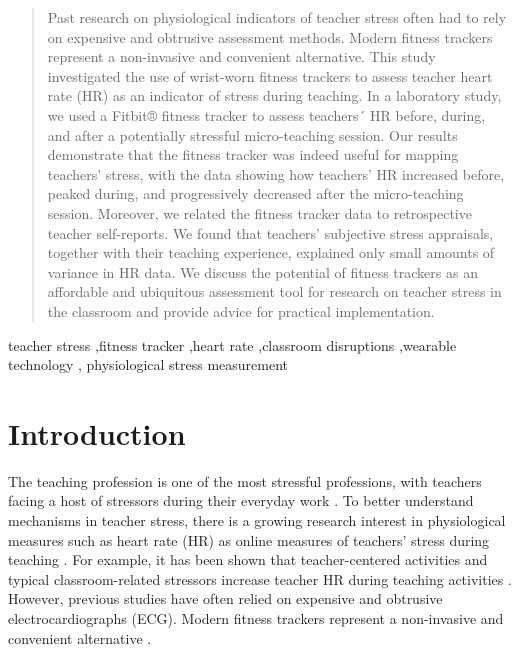 \documentclass[preprint,
3p]{elsarticle} %
\begin{document}
\begin{frontmatter}
  \begin{abstract}
  Past research on physiological indicators of teacher stress often had
  to rely on expensive and obtrusive assessment methods. Modern fitness
  trackers represent a non-invasive and convenient alternative. This
  study investigated the use of wrist-worn fitness trackers to assess
  teacher heart rate (HR) as an indicator of stress during teaching. In
  a laboratory study, we used a Fitbit® fitness tracker to assess
  teachers´ HR before, during, and after a potentially stressful
  micro-teaching session. Our results demonstrate that the fitness
  tracker was indeed useful for mapping teachers' stress, with the data
  showing how teachers' HR increased before, peaked during, and
  progressively decreased after the micro-teaching session. Moreover, we
  related the fitness tracker data to retrospective teacher
  self-reports. We found that teachers' subjective stress appraisals,
  together with their teaching experience, explained only small amounts
  of variance in HR data. We discuss the potential of fitness trackers
  as an affordable and ubiquitous assessment tool for research on
  teacher stress in the classroom and provide advice for practical
  implementation.
  \end{abstract}
    \begin{keyword}
    teacher stress \sep fitness tracker \sep heart rate \sep classroom
disruptions \sep wearable technology \sep 
    physiological stress measurement
  \end{keyword}
  
 \end{frontmatter}

\section{Introduction}\label{introduction}

The teaching profession is one of the most stressful professions, with
teachers facing a host of stressors during their everyday work
\citep{smith2000, herman2020, schult2014belastet}. To better understand
mechanisms in teacher stress, there is a growing research interest in
physiological measures such as heart rate (HR) as online measures of
teachers' stress during teaching
\citep{karner2021teachers, wettstein2020ambulatory}. For example, it has
been shown that teacher-centered activities and typical
classroom-related stressors increase teacher HR during teaching
activities
\citep{sperka1995, scheuch1997psychophysische, donker2018, junker2021, huang2022class}.
However, previous studies have often relied on expensive and obtrusive
electrocardiographs (ECG). Modern fitness trackers represent a
non-invasive and convenient alternative \citep{ferguson2015}.
\end{document}
